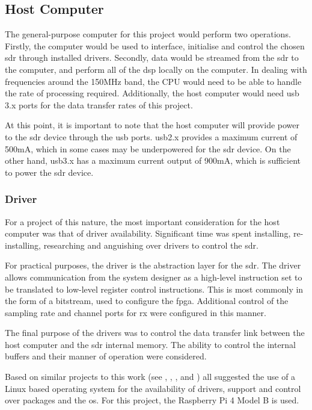 \documentclass[class=report,11pt,crop=false]{standalone}
\begin{document}
\subsection{Host Computer}
The general-purpose computer for this project would perform two operations. Firstly, the computer would be used to interface, initialise and control the chosen \gls{sdr} through installed drivers. Secondly, data would be streamed from the \gls{sdr} to the computer, and perform all of the \gls{dsp} locally on the computer. In dealing with frequencies around the 150MHz band, the CPU would need to be able to handle the rate of processing required. Additionally, the host computer would need \gls{usb} 3.x ports for the data transfer rates of this project. 

At this point, it is important to note that the host computer will provide power to the \gls{sdr} device through the \gls{usb} ports. \gls{usb}2.x provides a maximum current of 500mA, which in some cases may be underpowered for the \gls{sdr} device. On the other hand, \gls{usb}3.x has a maximum current output of 900mA, which is sufficient to power the \gls{sdr} device. 

\subsubsection{Driver}
For a project of this nature, the most important consideration for the host computer was that of driver availability. Significant time was spent installing, re-installing, researching and anguishing over drivers to control the \gls{sdr}. 

For practical purposes, the driver is the abstraction layer for the \gls{sdr}. The driver allows communication from the system designer as a high-level instruction set to be translated to low-level register control instructions. This is most commonly in the form of a bitstream, used to configure the \gls{fpga}. Additional control of the sampling rate and channel ports for \gls{rx} were configured in this manner. 

The final purpose of the drivers was to control the data transfer link between the host computer and the \gls{sdr} internal memory. The ability to control the internal buffers and their manner of operation were considered. 

Based on similar projects to this work (see \cite{sdr-modern-approach}, \cite{pd-thesis}, \cite{gnu-con17}, \cite{kerberos} and \cite{myriad}) all suggested the use of a Linux based operating system for the availability of drivers, support and control over packages and the \gls{os}. For this project, the Raspberry Pi 4 Model B is used.  
\end{document}
